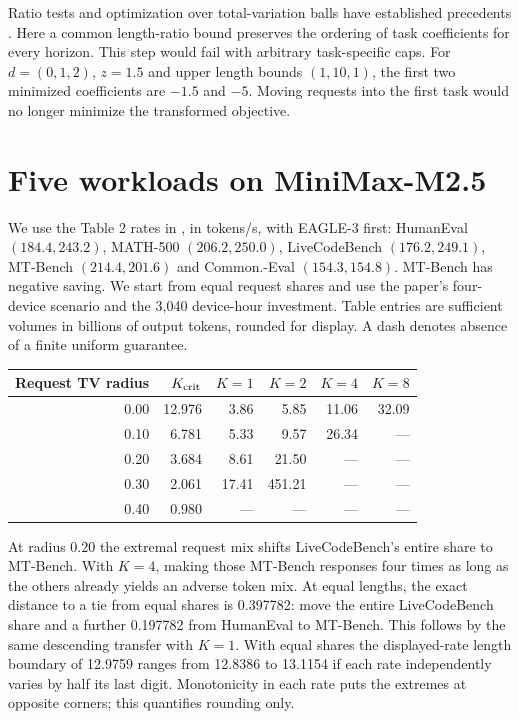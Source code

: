 \documentclass[11pt]{article}
\begin{document}
Ratio tests and optimization over total-variation balls have established precedents \cite{dinkel,tv}. Here a common length-ratio bound preserves the ordering of task coefficients for every horizon. This step would fail with arbitrary task-specific caps. For $d=(0,1,2)$, $z=1.5$ and upper length bounds $(1,10,1)$, the first two minimized coefficients are $-1.5$ and $-5$. Moving requests into the first task would no longer minimize the transformed objective.

\newpage
\section{Five workloads on MiniMax-M2.5}
We use the Table 2 rates in \cite{osprey}, in tokens/s, with EAGLE-3 first: HumanEval $(184.4,243.2)$, MATH-500 $(206.2,250.0)$, LiveCodeBench $(176.2,249.1)$, MT-Bench $(214.4,201.6)$ and Common.-Eval $(154.3,154.8)$. MT-Bench has negative saving. We start from equal request shares and use the paper's four-device scenario and the 3,040 device-hour investment. Table entries are sufficient volumes in billions of output tokens, rounded for display. A dash denotes absence of a finite uniform guarantee.
\begin{center}
\begin{tabular}{rrrrrr}\toprule
Request TV radius & $K_{\rm crit}$ & $K=1$ & $K=2$ & $K=4$ & $K=8$\\\midrule
0.00 &12.976&3.86&5.85&11.06&32.09\\
0.10 &6.781&5.33&9.57&26.34&---\\
0.20 &3.684&8.61&21.50&---&---\\
0.30 &2.061&17.41&451.21&---&---\\
0.40 &0.980&---&---&---&---\\\bottomrule
\end{tabular}
\end{center}
At radius 0.20 the extremal request mix shifts LiveCodeBench's entire share to MT-Bench. With $K=4$, making those MT-Bench responses four times as long as the others already yields an adverse token mix. At equal lengths, the exact distance to a tie from equal shares is 0.397782: move the entire LiveCodeBench share and a further 0.197782 from HumanEval to MT-Bench. This follows by the same descending transfer with $K=1$. With equal shares the displayed-rate length boundary of 12.9759 ranges from 12.8386 to 13.1154 if each rate independently varies by half its last digit. Monotonicity in each rate puts the extremes at opposite corners; this quantifies rounding only.
\end{document}
